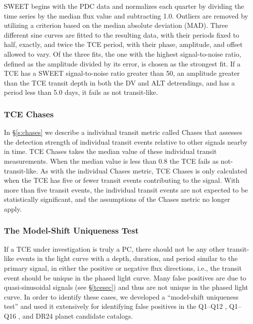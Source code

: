 SWEET begins with the PDC data and normalizes each quarter by dividing the time series by the median flux value and subtracting 1.0. Outliers are removed by utilizing a criterion based on the median absolute deviation (MAD). Three different sine curves are fitted to the resulting data, with their periods fixed to half, exactly, and twice the TCE period, with their phase, amplitude, and offset allowed to vary. Of the three fits, the one with the highest signal-to-noise ratio, defined as the amplitude divided by its error, is chosen as the strongest fit. If a TCE has a SWEET signal-to-noise ratio greater than 50, an amplitude greater than the TCE transit depth in both the DV and ALT detrendings, and has a period less than 5.0 days, it fails as not transit-like.




\subsubsection{TCE Chases}
\label{s:tcechases}

In \S\ref{s:chases} we describe a individual transit metric called Chases that assesses the detection strength of individual transit events relative to other signals nearby in time. TCE Chases takes the median value of these individual transit measurements.  When the median value is less than 0.8 the TCE fails as not-transit-like.  As with the individual Chases metric, TCE Chases is only calculated when the TCE has five or fewer transit events contributing to the signal.  With more than five transit events, the individual transit events are not expected to be statistically significant, and the assumptions of the Chases metric no longer apply.


\subsubsection{The Model-Shift Uniqueness Test}
\label{s:ms}

If a TCE under investigation is truly a PC, there should not be any other transit-like events in the light curve with a depth, duration, and period similar to the primary signal, in either the positive or negative flux directions, i.e., the transit event should be unique in the phased light curve. Many false positives are due to quasi-sinusoidal signals (see \S\ref{tcesec}) and thus are not unique in the phased light curve. In order to identify these cases, we developed a ``model-shift uniqueness test'' and used it extensively for identifying false positives in the Q1--Q12 \citep{Rowe2015a}, Q1--Q16 \citep{Mullally2015cat}, and DR24 \citep{Coughlin2016} planet candidate catalogs.

